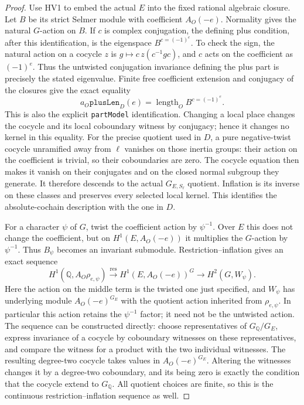 \begin{proof}
Use HV1 to embed the actual $E$ into the fixed rational
algebraic closure.  Let $B$ be its strict Selmer module with
coefficient $A_O(-e)$.  Normality gives the natural $G$-action
on $B$.  If $c$ is complex conjugation, the defining plus
condition, after this identification, is the eigenspace
$B^{c=(-1)^e}$.  To check the sign, the natural action on a
cocycle $z$ is $g\mapsto c\,z(c^{-1}gc)$, and $c$ acts on
the coefficient as $(-1)^e$.  Thus the untwisted conjugation
invariance defining the plus part is precisely the stated
eigenvalue.  Finite free coefficient extension and conjugacy
of the closures give the exact equality
\[
 a_O\mathtt{plusLen}_D(e)
                    =\operatorname{length}_O B^{c=(-1)^e}.
 \tag{HV.15}
\]
This is also the explicit \texttt{partModel} identification.
Changing a local place changes the cocycle and its local
coboundary witness by conjugacy; hence it changes no kernel
in this equality.
For the precise quotient used in $D$, a pure negative-twist
cocycle unramified away from $\ell$ vanishes on those inertia
groups: their action on the coefficient is trivial, so their
coboundaries are zero.  The cocycle equation then makes it
vanish on their conjugates and on the closed normal subgroup
they generate.  It therefore descends to the actual
$G_{E,S_\ell}$ quotient.  Inflation is its inverse on these
classes and preserves every selected local kernel.  This
identifies the absolute-cochain description with the one in $D$.

For a character $\psi$ of $G$, twist the coefficient action by
$\psi^{-1}$.  Over $E$ this does not change the coefficient,
but on $H^1(E,A_O(-e))$ it multiplies the $G$-action by
$\psi^{-1}$.  Thus $B_\psi$ becomes an invariant submodule.
Restriction--inflation gives an exact sequence
\[
 H^1(\mathbb Q,A_O\rho_{e,\psi})
 \xrightarrow{\mathrm{res}}H^1(E,A_O(-e))^G
 \longrightarrow H^2(G,W_\psi).
 \tag{HV.16}
\]
Here the action on the middle term is the twisted one just
specified, and $W_\psi$ has underlying module
$A_O(-e)^{G_E}$ with the quotient action inherited from
$\rho_{e,\psi}$.  In particular this action retains the
$\psi^{-1}$ factor; it need not be the untwisted action.
The sequence can be constructed directly: choose representatives
of $G_{\mathbb Q}/G_E$, express invariance of a cocycle by
coboundary witnesses on these representatives, and compare the
witness for a product with the two individual witnesses.
The resulting degree-two cocycle takes values in
$A_O(-e)^{G_E}$.  Altering the witnesses changes it by a
degree-two coboundary, and its being zero is exactly the
condition that the cocycle extend to $G_{\mathbb Q}$.
All quotient choices are finite, so this is the continuous
restriction--inflation sequence as well.


\end{proof}
